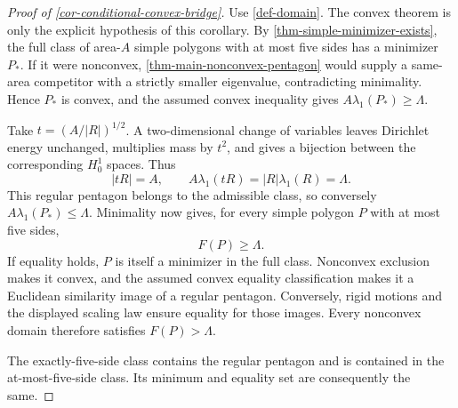\documentclass[11pt,a4paper]{article}
\theoremstyle{proofmanuscript}
\begin{document}
\begin{proof}[Proof of \ref{cor-conditional-convex-bridge}]

Use \ref{def-domain}. The convex theorem is only the explicit hypothesis of this corollary. By \ref{thm-simple-minimizer-exists}, the full class of area-\(A\) simple polygons with at most five sides has a minimizer \(P_*\). If it were nonconvex, \ref{thm-main-nonconvex-pentagon} would supply a same-area competitor with a strictly smaller eigenvalue, contradicting minimality. Hence \(P_*\) is convex, and the assumed convex inequality gives \(A\lambda_1(P_*)\ge\Lambda\).

Take \(t=(A/|R|)^{1/2}\). A two-dimensional change of variables leaves Dirichlet energy unchanged, multiplies mass by \(t^2\), and gives a bijection between the corresponding \(H_0^1\) spaces. Thus \[
|tR|=A,\qquad A\lambda_1(tR)=|R|\lambda_1(R)=\Lambda.
\] This regular pentagon belongs to the admissible class, so conversely \(A\lambda_1(P_*)\le\Lambda\). Minimality now gives, for every simple polygon \(P\) with at most five sides, \[
F(P)\ge\Lambda.
\] If equality holds, \(P\) is itself a minimizer in the full class. Nonconvex exclusion makes it convex, and the assumed convex equality classification makes it a Euclidean similarity image of a regular pentagon. Conversely, rigid motions and the displayed scaling law ensure equality for those images. Every nonconvex domain therefore satisfies \(F(P)>\Lambda\).

The exactly-five-side class contains the regular pentagon and is contained in the at-most-five-side class. Its minimum and equality set are consequently the same.

\end{proof}
\end{document}
